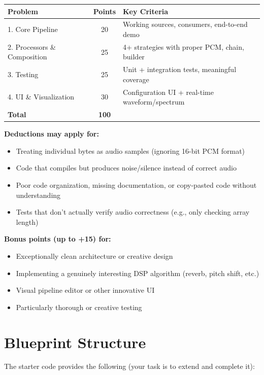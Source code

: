 \documentclass[a4paper,12pt]{article}
\begin{document}
\begin{center}
\begin{tabular}{|l|c|l|}
\hline
\textbf{Problem} & \textbf{Points} & \textbf{Key Criteria} \\
\hline
1. Core Pipeline & 20 & Working sources, consumers, end-to-end demo \\
\hline
2. Processors \& Composition & 25 & 4+ strategies with proper PCM, chain, builder \\
\hline
3. Testing & 25 & Unit + integration tests, meaningful coverage \\
\hline
4. UI \& Visualization & 30 & Configuration UI + real-time waveform/spectrum \\
\hline
\textbf{Total} & \textbf{100} & \\
\hline
\end{tabular}
\end{center}

\textbf{Deductions may apply for:}
\begin{itemize}
    \item Treating individual bytes as audio samples (ignoring 16-bit PCM format)
    \item Code that compiles but produces noise/silence instead of correct audio
    \item Poor code organization, missing documentation, or copy-pasted code without understanding
    \item Tests that don't actually verify audio correctness (e.g., only checking array length)
\end{itemize}

\textbf{Bonus points (up to +15) for:}
\begin{itemize}
    \item Exceptionally clean architecture or creative design
    \item Implementing a genuinely interesting DSP algorithm (reverb, pitch shift, etc.)
    \item Visual pipeline editor or other innovative UI
    \item Particularly thorough or creative testing
\end{itemize}


\section{Blueprint Structure}

The starter code provides the following (your task is to extend and complete it):
\end{document}
